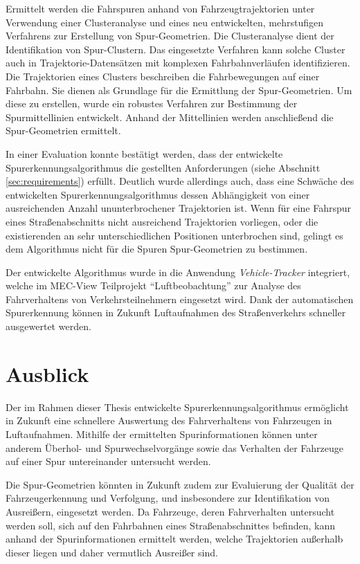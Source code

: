 Ermittelt werden die Fahrspuren anhand von Fahrzeugtrajektorien unter Verwendung einer Clusteranalyse und
eines neu entwickelten, mehrstufigen Verfahrens zur Erstellung von Spur-Geometrien.
Die Clusteranalyse dient der Identifikation von Spur-Clustern. Das eingesetzte Verfahren kann
solche Cluster auch in Trajektorie-Datensätzen mit komplexen Fahrbahnverläufen identifizieren.
Die Trajektorien eines Clusters beschreiben die Fahrbewegungen auf einer Fahrbahn.
Sie dienen als Grundlage für die Ermittlung der Spur-Geometrien. Um diese zu erstellen, wurde
ein robustes Verfahren zur Bestimmung der Spurmittellinien entwickelt. Anhand der Mittellinien werden
anschließend die Spur-Geometrien ermittelt. 

In einer Evaluation konnte bestätigt werden, dass der entwickelte Spurerkennungsalgorithmus die gestellten
Anforderungen (siehe Abschnitt \ref{sec:requirements}) erfüllt. 
Deutlich wurde allerdings auch, dass eine Schwäche des entwickelten Spurerkennungsalgorithmus
dessen Abhängigkeit von einer ausreichenden Anzahl ununterbrochener Trajektorien ist. Wenn für eine
Fahrspur eines Straßenabschnitts nicht ausreichend Trajektorien vorliegen, oder die existierenden an sehr
unterschiedlichen Positionen unterbrochen sind, gelingt es dem Algorithmus nicht für die Spuren
Spur-Geometrien zu bestimmen.

Der entwickelte Algorithmus wurde in die Anwendung \textit{Vehicle-Tracker} integriert,
welche im MEC-View Teilprojekt ``Luftbeobachtung'' zur Analyse des Fahrverhaltens von Verkehrsteilnehmern
eingesetzt wird. Dank der automatischen Spurerkennung können in Zukunft Luftaufnahmen des Straßenverkehrs
schneller ausgewertet werden.

\section{Ausblick}

Der im Rahmen dieser Thesis entwickelte Spurerkennungsalgorithmus ermöglicht in Zukunft eine schnellere Auswertung
des Fahrverhaltens von Fahrzeugen in Luftaufnahmen. Mithilfe der ermittelten Spurinformationen können
unter anderem Überhol- und Spurwechselvorgänge sowie das Verhalten der Fahrzeuge auf einer Spur
untereinander untersucht werden.

Die Spur-Geometrien könnten in Zukunft zudem zur Evaluierung der Qualität der Fahrzeugerkennung und Verfolgung,
und insbesondere zur Identifikation von Ausreißern, eingesetzt werden.
Da Fahrzeuge, deren Fahrverhalten untersucht werden soll, sich auf den Fahrbahnen eines Straßenabschnittes befinden,
kann anhand der Spurinformationen ermittelt werden, welche Trajektorien außerhalb dieser liegen und
daher vermutlich Ausreißer sind.

